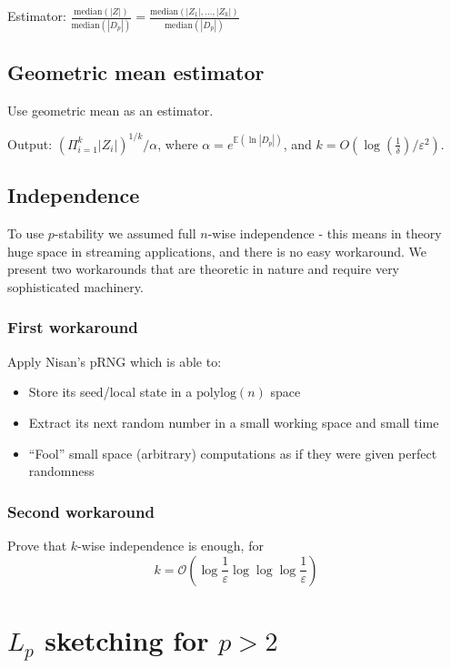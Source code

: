 \documentclass[11pt]{article}
\newcommand{\E}{{\mathbb E}}
\begin{document}
\medskip
\noindent
Estimator: $\frac{\textrm{median}(|Z|)}{\textrm{median}(|D_p|)} = \frac{\textrm{median}(|Z_1|,\ldots,|Z_k|)}{\textrm{median}(|D_p|)}$


\subsection{Geometric mean estimator \cite{DBLP:conf/soda/Li08}}
Use geometric mean as an estimator. 

Output: $(\Pi_{i=1}^k|Z_i|)^{1/k} / \alpha$, where
$\alpha = e^{\E(\ln |D_p| )}$, and $k = O(\log(\frac{1}{\delta}) / \varepsilon^2)$.

\subsection{Independence}
To use $p$-stability we assumed full $n$-wise independence - this means in theory huge space in streaming applications, and there is no easy workaround.  We present two workarounds that are theoretic in nature and require very sophisticated machinery.
\subsubsection{First workaround \cite{DBLP:conf/focs/Indyk00}}
Apply Nisan’s pRNG which is able to:
\begin{itemize}
\item Store its seed/local state in a $\textrm{polylog}(n)$ space
\item Extract its next random number in a small working space and small time
\item “Fool” small space (arbitrary) computations as if they were given perfect randomness
\end{itemize}

\subsubsection{Second workaround \cite{DBLP:conf/stoc/KaneNPW11}}
Prove that $k$-wise independence is enough, for $$k = \mathcal{O}( \log \frac{1}{\varepsilon} \log\log\log \frac{1}{\varepsilon})$$

\section{$L_p$ sketching for $p > 2$}
\end{document}
